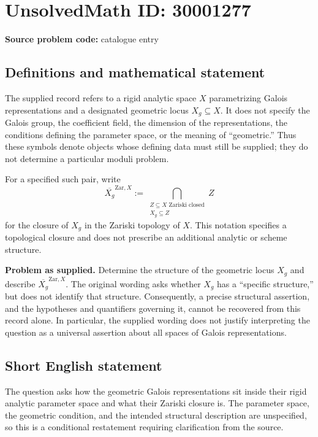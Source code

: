 \documentclass[11pt]{article}
\begin{document}
\section*{UnsolvedMath ID: 30001277}
\textbf{Source problem code:} catalogue entry
\subsection{Definitions and mathematical statement}
The supplied record refers to a rigid analytic space \(X\) parametrizing Galois representations and a designated geometric locus \(X_g\subseteq X\). It does not specify the Galois group, the coefficient field, the dimension of the representations, the conditions defining the parameter space, or the meaning of ``geometric.'' Thus these symbols denote objects whose defining data must still be supplied; they do not determine a particular moduli problem.

For a specified such pair, write
\[
\overline{X_g}^{\mathrm{Zar},X}
:=\bigcap_{\substack{Z\subseteq X\text{ Zariski closed}\\X_g\subseteq Z}} Z
\]
for the closure of \(X_g\) in the Zariski topology of \(X\). This notation specifies a topological closure and does not prescribe an additional analytic or scheme structure.

\textbf{Problem as supplied.} Determine the structure of the geometric locus \(X_g\) and describe \(\overline{X_g}^{\mathrm{Zar},X}\). The original wording asks whether \(X_g\) has a ``specific structure,'' but does not identify that structure. Consequently, a precise structural assertion, and the hypotheses and quantifiers governing it, cannot be recovered from this record alone. In particular, the supplied wording does not justify interpreting the question as a universal assertion about all spaces of Galois representations.
\subsection{Short English statement}
The question asks how the geometric Galois representations sit inside their rigid analytic parameter space and what their Zariski closure is. The parameter space, the geometric condition, and the intended structural description are unspecified, so this is a conditional restatement requiring clarification from the source.
\end{document}
